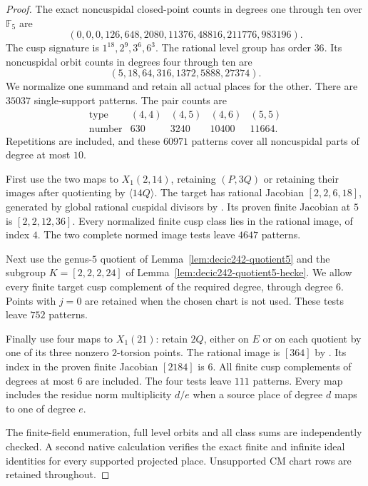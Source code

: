 \begin{proof}
The exact noncuspidal closed-point counts in degrees one through
ten over $\mathbb F_5$ are
\[
 (0,0,0,126,648,2080,11376,48816,211776,983196).
\]
The cusp signature is $1^{18},2^9,3^6,6^3$.
The rational level group has order $36$.
Its noncuspidal orbit counts in degrees four through ten are
\[
 (5,18,64,316,1372,5888,27374).
\]
We normalize one summand and retain all actual places for the
other. There are $35037$ single-support patterns. The pair counts are
\[
\begin{array}{c|rrrr}
\text{type}&(4,4)&(4,5)&(4,6)&(5,5)\\\hline
\text{number}&630&3240&10400&11664.
\end{array}
\]
Repetitions are included, and these $60971$ patterns cover all
noncuspidal parts of degree at most $10$.

First use the two maps to $X_1(2,14)$, retaining $(P,3Q)$ or
retaining their images after quotienting by $\langle14Q\rangle$.
The target has rational Jacobian $[2,2,6,18]$, generated by global
rational cuspidal divisors by
\cite[Proposition~4.16 and Table~3]{DEHMZ}.
Its proven finite Jacobian at $5$ is $[2,2,12,36]$.
Every normalized finite cusp class lies in the rational image,
of index $4$.
The two complete normed image tests leave $4647$ patterns.

Next use the genus-$5$ quotient of
Lemma~\ref{lem:decic242-quotient5} and the subgroup
$K=[2,2,2,24]$ of Lemma~\ref{lem:decic242-quotient5-hecke}.
We allow every finite target cusp complement of the required
degree, through degree $6$.
Points with $j=0$ are retained when the chosen chart is not used.
These tests leave $752$ patterns.

Finally use four maps to $X_1(21)$: retain $2Q$, either on $E$
or on each quotient by one of its three nonzero $2$-torsion points.
The rational image is $[364]$ by
\cite[Theorems~3.1 and 4.13, and Table~2]{DEHMZ}.
Its index in the proven finite Jacobian $[2184]$ is $6$.
All finite cusp complements of degrees at most $6$ are included.
The four tests leave $111$ patterns.
Every map includes the residue norm multiplicity $d/e$ when a
source place of degree $d$ maps to one of degree $e$.

The finite-field enumeration, full level orbits and all class
sums are independently checked.
A second native calculation verifies the exact finite and infinite
ideal identities for every supported projected place.
Unsupported CM chart rows are retained throughout.
\end{proof}

